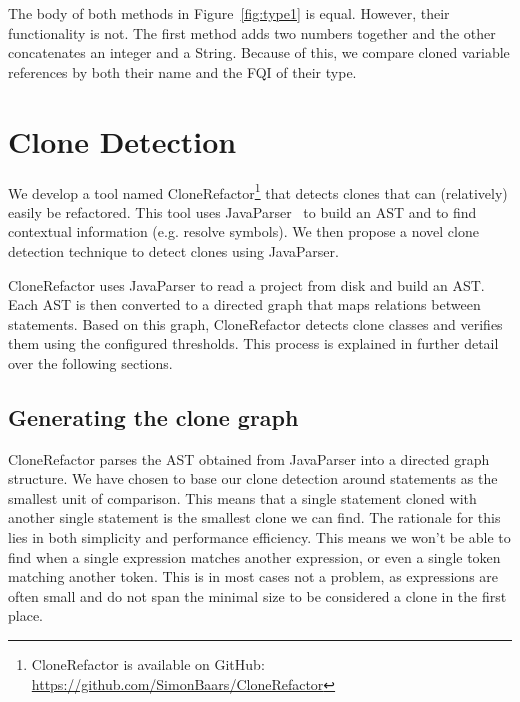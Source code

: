 \documentclass[journal]{IEEEtran}
\begin{document}
The body of both methods in Figure~\ref{fig:type1} is equal. However, their functionality is not. The first method adds two numbers together and the other concatenates an integer and a String. Because of this, we compare cloned variable references by both their name and the FQI of their type.

\section{Clone Detection}\label{sec:clonedetection}
We develop a tool named CloneRefactor\footnote{CloneRefactor is available on GitHub: \url{https://github.com/SimonBaars/CloneRefactor}} that detects clones that can (relatively) easily be refactored. This tool uses JavaParser~\cite{tomassetti2017javaparser} to build an AST and to find contextual information (e.g. resolve symbols). We then propose a novel clone detection technique to detect clones using JavaParser.


CloneRefactor uses JavaParser to read a project from disk and build an AST. %
Each AST is then converted to a directed graph that maps relations between statements. Based on this graph, CloneRefactor detects clone classes and verifies them using the configured thresholds. This process is explained in further detail over the following sections.


\subsection{Generating the clone graph}\label{sec:clonegraph}
CloneRefactor parses the AST obtained from JavaParser into a directed graph structure. We have chosen to base our clone detection around statements as the smallest unit of comparison. This means that a single statement cloned with another single statement is the smallest clone we can find. The rationale for this lies in both simplicity and performance efficiency. This means we won't be able to find when a single expression matches another expression, or even a single token matching another token. This is in most cases not a problem, as expressions are often small and do not span the minimal size to be considered a clone in the first place.
\end{document}
